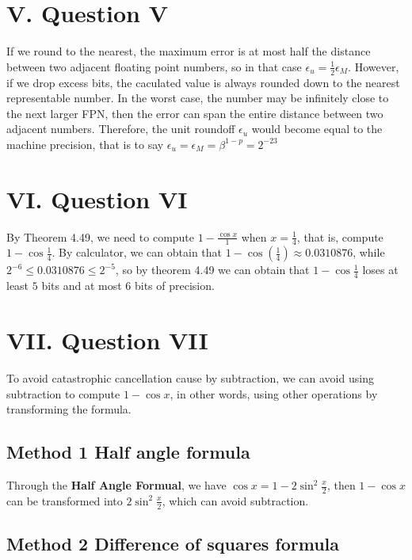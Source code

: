 \documentclass[a4paper]{article}
\begin{document}
\section*{V. Question V}

If we round to the nearest, the maximum error is at most half the distance between two adjacent floating point numbers, so in that case $\epsilon_u=\frac{1}{2}\epsilon_M$. However, if we drop excess bits, the caculated value is always rounded down to the nearest representable number. In the
worst case, the number may be infinitely close to the next larger FPN, then the error can span the entire distance between two adjacent numbers. Therefore, the unit roundoff $\epsilon_u$ would become equal to the machine precision, that is to say $\epsilon_u=\epsilon_M=\beta^{1-p}=2^{-23}$

\section*{VI. Question VI}

By Theorem 4.49, we need to compute $1-\frac{\cos x}{1}$ when $x=\frac{1}{4}$, that is, compute $1-\cos \frac{1}{4}$.
By calculator, we can obtain that $1-\cos(\frac{1}{4})\approx0.0310876$, while $2^{-6}\le0.0310876\leq 2^{-5}$, so by theorem 4.49 we can obtain that $1-\cos\frac{1}{4}$ loses at least $5$ bits and at most $6$ bits of precision.

\section*{VII. Question VII}

To avoid catastrophic cancellation cause by subtraction, we can avoid using subtraction to compute $1-\cos x$, in other words, using other operations by transforming the formula.

\subsection*{Method 1 Half angle formula}

Through the \textbf{Half Angle Formual}, we have $\cos x = 1-2\sin^2\frac{x}{2}$, then $1-\cos x$ can be transformed into $2\sin^2\frac{x}{2}$, which can avoid subtraction.

\subsection*{Method 2 Difference of squares formula}
\end{document}
